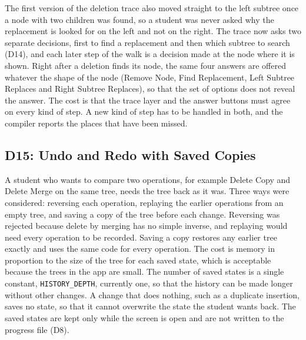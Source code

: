 The first version of the deletion trace also moved straight to the left subtree once a node with two children was found, so a student was never asked why the replacement is looked for on the left and not on the right. The trace now asks two separate decisions, first to find a replacement and then which subtree to search (D14), and each later step of the walk is a decision made at the node where it is shown. Right after a deletion finds its node, the same four answers are offered whatever the shape of the node (Remove Node, Find Replacement, Left Subtree Replaces and Right Subtree Replaces), so that the set of options does not reveal the answer. The cost is that the trace layer and the answer buttons must agree on every kind of step. A new kind of step has to be handled in both, and the compiler reports the places that have been missed.

\subsection{D15: Undo and Redo with Saved Copies}
A student who wants to compare two operations, for example Delete Copy and Delete Merge on the same tree, needs the tree back as it was. Three ways were considered: reversing each operation, replaying the earlier operations from an empty tree, and saving a copy of the tree before each change. Reversing was rejected because delete by merging has no simple inverse, and replaying would need every operation to be recorded. Saving a copy restores any earlier tree exactly and uses the same code for every operation. The cost is memory in proportion to the size of the tree for each saved state, which is acceptable because the trees in the app are small. The number of saved states is a single constant, \texttt{HISTORY\_DEPTH}, currently one, so that the history can be made longer without other changes. A change that does nothing, such as a duplicate insertion, saves no state, so that it cannot overwrite the state the student wants back. The saved states are kept only while the screen is open and are not written to the progress file (D8).

